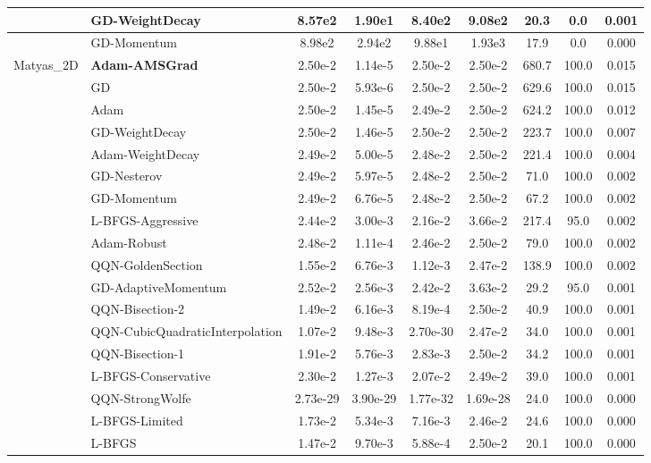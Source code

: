 \documentclass{article}
\begin{document}
\begin{longtable}{|l|l|c|c|c|c|c|c|c|}
\hline
 & GD-WeightDecay & 8.57e2 & 1.90e1 & 8.40e2 & 9.08e2 & 20.3 & 0.0 & 0.001 \\
\hline
 & GD-Momentum & 8.98e2 & 2.94e2 & 9.88e1 & 1.93e3 & 17.9 & 0.0 & 0.000 \\
Matyas\_2D & \textbf{Adam-AMSGrad} & 2.50e-2 & 1.14e-5 & 2.50e-2 & 2.50e-2 & 680.7 & 100.0 & 0.015 \\
\hline
 & GD & 2.50e-2 & 5.93e-6 & 2.50e-2 & 2.50e-2 & 629.6 & 100.0 & 0.015 \\
\hline
 & Adam & 2.50e-2 & 1.45e-5 & 2.49e-2 & 2.50e-2 & 624.2 & 100.0 & 0.012 \\
\hline
 & GD-WeightDecay & 2.50e-2 & 1.46e-5 & 2.50e-2 & 2.50e-2 & 223.7 & 100.0 & 0.007 \\
\hline
 & Adam-WeightDecay & 2.49e-2 & 5.00e-5 & 2.48e-2 & 2.50e-2 & 221.4 & 100.0 & 0.004 \\
\hline
 & GD-Nesterov & 2.49e-2 & 5.97e-5 & 2.48e-2 & 2.50e-2 & 71.0 & 100.0 & 0.002 \\
\hline
 & GD-Momentum & 2.49e-2 & 6.76e-5 & 2.48e-2 & 2.50e-2 & 67.2 & 100.0 & 0.002 \\
\hline
 & L-BFGS-Aggressive & 2.44e-2 & 3.00e-3 & 2.16e-2 & 3.66e-2 & 217.4 & 95.0 & 0.002 \\
\hline
 & Adam-Robust & 2.48e-2 & 1.11e-4 & 2.46e-2 & 2.50e-2 & 79.0 & 100.0 & 0.002 \\
\hline
 & QQN-GoldenSection & 1.55e-2 & 6.76e-3 & 1.12e-3 & 2.47e-2 & 138.9 & 100.0 & 0.002 \\
\hline
 & GD-AdaptiveMomentum & 2.52e-2 & 2.56e-3 & 2.42e-2 & 3.63e-2 & 29.2 & 95.0 & 0.001 \\
\hline
 & QQN-Bisection-2 & 1.49e-2 & 6.16e-3 & 8.19e-4 & 2.50e-2 & 40.9 & 100.0 & 0.001 \\
\hline
 & QQN-CubicQuadraticInterpolation & 1.07e-2 & 9.48e-3 & 2.70e-30 & 2.47e-2 & 34.0 & 100.0 & 0.001 \\
\hline
 & QQN-Bisection-1 & 1.91e-2 & 5.76e-3 & 2.83e-3 & 2.50e-2 & 34.2 & 100.0 & 0.001 \\
\hline
 & L-BFGS-Conservative & 2.30e-2 & 1.27e-3 & 2.07e-2 & 2.49e-2 & 39.0 & 100.0 & 0.001 \\
\hline
 & QQN-StrongWolfe & 2.73e-29 & 3.90e-29 & 1.77e-32 & 1.69e-28 & 24.0 & 100.0 & 0.000 \\
\hline
 & L-BFGS-Limited & 1.73e-2 & 5.34e-3 & 7.16e-3 & 2.46e-2 & 24.6 & 100.0 & 0.000 \\
\hline
 & L-BFGS & 1.47e-2 & 9.70e-3 & 5.88e-4 & 2.50e-2 & 20.1 & 100.0 & 0.000 \\

\end{longtable}
\end{document}
